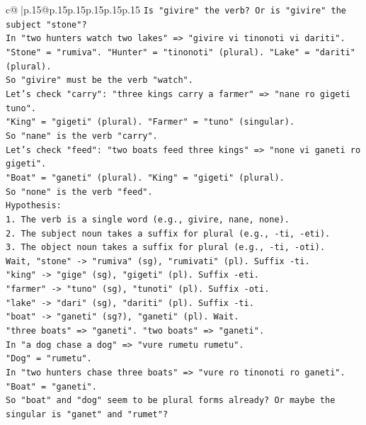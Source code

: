 \documentclass{article}
\begin{document}
{\begin{supertabular}{c@{$\;$}|p{.15\linewidth}@{}p{.15\linewidth}p{.15\linewidth}p{.15\linewidth}p{.15\linewidth}p{.15\linewidth}}
{{{\texttt{Is "givire" the verb? Or is "givire" the subject "stone"?} \\
\texttt{In "two hunters watch two lakes" => "givire vi tinonoti vi dariti".} \\
\texttt{"Stone" = "rumiva". "Hunter" = "tinonoti" (plural). "Lake" = "dariti" (plural).} \\
\texttt{So "givire" must be the verb "watch".} \\
\texttt{Let's check "carry": "three kings carry a farmer" => "nane ro gigeti tuno".} \\
\texttt{"King" = "gigeti" (plural). "Farmer" = "tuno" (singular).} \\
\texttt{So "nane" is the verb "carry".} \\
\texttt{Let's check "feed": "two boats feed three kings" => "none vi ganeti ro gigeti".} \\
\texttt{"Boat" = "ganeti" (plural). "King" = "gigeti" (plural).} \\
\texttt{So "none" is the verb "feed".} \\
\texttt{Hypothesis:} \\
\texttt{1. The verb is a single word (e.g., givire, nane, none).} \\
\texttt{2. The subject noun takes a suffix for plural (e.g., {-}ti, {-}eti).} \\
\texttt{3. The object noun takes a suffix for plural (e.g., {-}ti, {-}oti).} \\
\texttt{Wait, "stone" {-}> "rumiva" (sg), "rumivati" (pl). Suffix {-}ti.} \\
\texttt{"king" {-}> "gige" (sg), "gigeti" (pl). Suffix {-}eti.} \\
\texttt{"farmer" {-}> "tuno" (sg), "tunoti" (pl). Suffix {-}oti.} \\
\texttt{"lake" {-}> "dari" (sg), "dariti" (pl). Suffix {-}ti.} \\
\texttt{"boat" {-}> "ganeti" (sg?), "ganeti" (pl). Wait.} \\
\texttt{"three boats" => "ganeti". "two boats" => "ganeti".} \\
\texttt{In "a dog chase a dog" => "vure rumetu rumetu".} \\
\texttt{"Dog" = "rumetu".} \\
\texttt{In "two hunters chase three boats" => "vure ro tinonoti ro ganeti".} \\
\texttt{"Boat" = "ganeti".} \\
\texttt{So "boat" and "dog" seem to be plural forms already? Or maybe the singular is "ganet" and "rumet"?} \\
}}}
\end{supertabular}}
\end{document}
